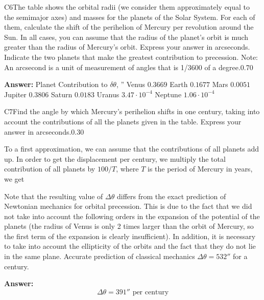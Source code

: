 \documentclass[11pt,a4paper]{article}
\begin{document}
\begin{solcard}{C6}{The table shows the orbital radii (we consider them approximately equal to the semimajor axes) and masses for the planets of the Solar System. For each of them, calculate the shift of the perihelion of Mercury per revolution around the Sun. In all cases, you can assume that the radius of the planet’s orbit is much greater than the radius of Mercury’s orbit. Express your answer in arcseconds. Indicate the two planets that make the greatest contribution to precession. Note: An arcsecond is a unit of measurement of angles that is 1/3600 of a degree.}{0.70}
\par\smallskip\noindent\textbf{Answer:} Planet Contribution to $\delta \theta$, '' Venus $0.3669$ Earth $0.1677$ Mars $0.0051$ Jupiter $0.3806$ Saturn $0.0183$ Uranus $3.47\cdot 10^{-4} $ Neptune $1.06 \cdot 10^{-4}$
\end{solcard}

\begin{solcard}{C7}{Find the angle by which Mercury's perihelion shifts in one century, taking into account the contributions of all the planets given in the table. Express your answer in arcseconds.}{0.30}

To a first approximation, we can assume that the contributions of all planets add up. In order to get the displacement per century, we multiply the total contribution of all planets by $100/T$, where $T$ is the period of Mercury in years, we get


Note that the resulting value of $\Delta \theta$ differs from the exact prediction of Newtonian mechanics for orbital precession. This is due to the fact that we did not take into account the following orders in the expansion of the potential of the planets (the radius of Venus is only 2 times larger than the orbit of Mercury, so the first term of the expansion is clearly insufficient). In addition, it is necessary to take into account the ellipticity of the orbits and the fact that they do not lie in the same plane. Accurate prediction of classical mechanics $\Delta \theta = 532 ''$ for a century.

\par\smallskip\noindent\textbf{Answer:} $$ \Delta \theta = 391'' \text{ per century} $$
\end{solcard}
\end{document}
